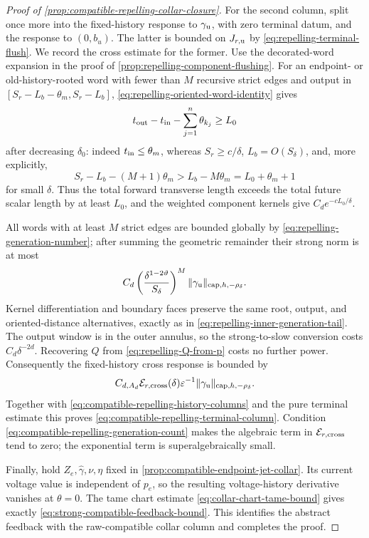 \begin{proof}[Proof of
\cref{prop:compatible-repelling-collar-closure}]
For the second column, split once more into the fixed-history response to
\(\gamma_{\rm u}\), with zero terminal datum, and the response to
\((0,b_u)\).  The latter is bounded on \(J_{r,\rm u}\) by
\cref{eq:repelling-terminal-flush}.  We record the cross estimate for the
former.  Use the decorated-word expansion in the proof of
\cref{prop:repelling-component-flushing}.  For an endpoint- or
old-history-rooted word with fewer than \(M\) recursive strict edges and
output in \([S_r-L_b-\theta_m,S_r-L_b]\),
\cref{eq:repelling-oriented-word-identity} gives
\begin{equation*}
 t_{\rm out}-t_{\rm in}
      -\sum_{j=1}^n\theta_{k_j}\ge L_0
\end{equation*}
after decreasing \(\delta_0\): indeed \(t_{\rm in}\le\theta_m\), whereas
\(S_r\ge c/\delta\), \(L_b=O(S_\delta)\), and, more explicitly,
\begin{equation*}
 S_r-L_b-(M+1)\theta_m
   >L_b-M\theta_m=L_0+\theta_m+1
\end{equation*}
for small \(\delta\).  Thus the total forward
transverse length exceeds the total future scalar length by at least
\(L_0\), and the weighted component kernels give
\(C_de^{-cL_0/\delta}\).

All words with at least \(M\) strict edges are bounded globally by
\cref{eq:repelling-generation-number}; after summing the geometric
remainder their strong norm is at most
\begin{equation*}
 C_d\left(\frac{\delta^{1-2\vartheta}}{S_\delta}\right)^M
       \|\gamma_{\rm u}\|_{\mathrm{cap},h,-\rho_\delta}.
\end{equation*}
Kernel differentiation and boundary faces preserve the same root, output,
and oriented-distance alternatives, exactly as in
\cref{eq:repelling-inner-generation-tail}.  The output window is in the
outer annulus, so the strong-to-slow conversion costs
\(C_d\delta^{-2d}\).  Recovering \(Q\) from
\cref{eq:repelling-Q-from-p} costs no further power.  Consequently the
fixed-history cross response is bounded by
\begin{equation*}
 C_{d,A_d}\mathcal E_{r,\rm cross}(\delta)
       \varepsilon^{-1}
       \|\gamma_{\rm u}\|_{\mathrm{cap},h,-\rho_\delta}.
\end{equation*}
Together with \cref{eq:compatible-repelling-history-columns} and the pure
terminal estimate this proves
\cref{eq:compatible-repelling-terminal-column}.  Condition
\cref{eq:compatible-repelling-generation-count} makes the algebraic term in
\(\mathcal E_{r,\rm cross}\) tend to zero; the exponential term is
superalgebraically small.

Finally, hold \(Z_e,\widehat\gamma,\nu,\eta\) fixed in
\cref{prop:compatible-endpoint-jet-collar}.  Its current voltage value is
independent of \(p_e\), so the resulting voltage-history derivative
vanishes at \(\theta=0\).  The tame chart estimate
\cref{eq:collar-chart-tame-bound} gives exactly
\cref{eq:strong-compatible-feedback-bound}.  This identifies the abstract
feedback with the raw-compatible collar column and completes the proof.
\end{proof}


